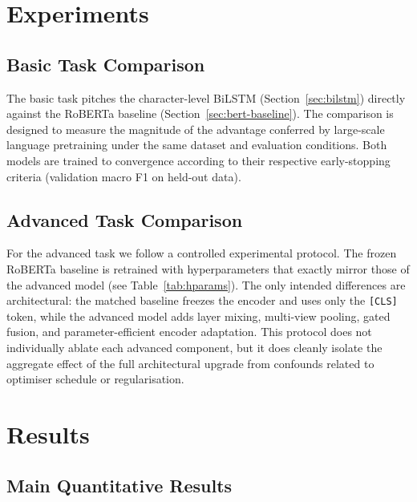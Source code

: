 \documentclass{article}
\begin{document}
\section{Experiments}

\subsection{Basic Task Comparison}

The basic task pitches the character-level BiLSTM (Section~\ref{sec:bilstm})
directly against the RoBERTa baseline (Section~\ref{sec:bert-baseline}).  The
comparison is designed to measure the magnitude of the advantage conferred by
large-scale language pretraining under the same dataset and evaluation
conditions.  Both models are trained to convergence according to their
respective early-stopping criteria (validation macro F1 on held-out data).

\subsection{Advanced Task Comparison}

For the advanced task we follow a controlled experimental protocol.  The frozen
RoBERTa baseline is retrained with hyperparameters that exactly mirror those
of the advanced model (see Table~\ref{tab:hparams}).  The only intended
differences are architectural: the matched baseline freezes the encoder and
uses only the \texttt{[CLS]} token, while the advanced model adds layer mixing,
multi-view pooling, gated fusion, and parameter-efficient encoder adaptation.
This protocol does not individually ablate each advanced component, but it does
cleanly isolate the aggregate effect of the full architectural upgrade from
confounds related to optimiser schedule or regularisation.

\section{Results}

\subsection{Main Quantitative Results}
\end{document}
